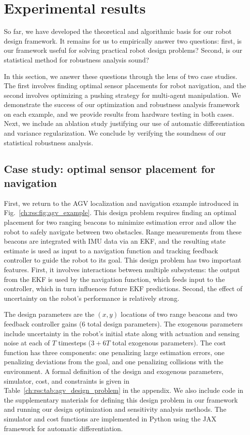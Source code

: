 \section{Experimental results}\label{ch:rss:cases}

So far, we have developed the theoretical and algorithmic basis for our robot design framework. It remains for us to empirically answer two questions: first, is our framework useful for solving practical robot design problems? Second, is our statistical method for robustness analysis sound?

In this section, we answer these questions through the lens of two case studies. The first involves finding optimal sensor placements for robot navigation, and the second involves optimizing a pushing strategy for multi-agent manipulation. We demonstrate the success of our optimization and robustness analysis framework on each example, and we provide results from hardware testing in both cases. Next, we include an ablation study justifying our use of automatic differentiation and variance regularization. We conclude by verifying the soundness of our statistical robustness analysis.

\subsection{Case study: optimal sensor placement for navigation}\label{ch:rss:case1}

First, we return to the AGV localization and navigation example introduced in Fig.~\ref{ch:rss:fig:agv_example}. This design problem requires finding an optimal placement for two ranging beacons to minimize estimation error and allow the robot to safely navigate between two obstacles. Range measurements from these beacons are integrated with IMU data via an EKF, and the resulting state estimate is used as input to a navigation function and tracking feedback controller to guide the robot to its goal. This design problem has two important features. First, it involves interactions between multiple subsystems: the output from the EKF is used by the navigation function, which feeds input to the controller, which in turn influences future EKF predictions. Second, the effect of uncertainty on the robot's performance is relatively strong.

The design parameters are the $(x, y)$ locations of two range beacons and two feedback controller gains (6 total design parameters). The exogenous parameters include uncertainty in the robot's initial state along with actuation and sensing noise at each of $T$ timesteps ($3 + 6T$ total exogenous parameters). The cost function has three components: one penalizing large estimation errors, one penalizing deviations from the goal, and one penalizing collisions with the environment. A formal definition of the design and exogenous parameters, simulator, cost, and constraints is given in Table~\ref{ch:rss:tab:agv_design_problem} in the appendix. We also include code in the supplementary materials for defining this design problem in our framework and running our design optimization and sensitivity analysis methods. The simulator and cost functions are implemented in Python using the JAX framework for automatic differentiation.

